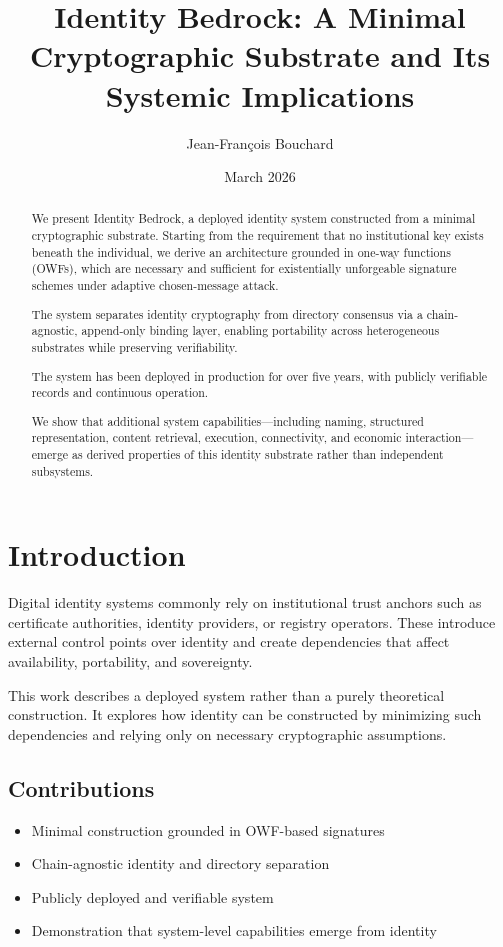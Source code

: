 \documentclass[11pt,a4paper]{article}
\title{\textbf{Identity Bedrock: A Minimal Cryptographic Substrate and Its Systemic Implications}}
\author{Jean-François Bouchard}
\date{March 2026}
\begin{document}
\maketitle

\begin{abstract}
We present Identity Bedrock, a deployed identity system constructed from a minimal cryptographic substrate. Starting from the requirement that no institutional key exists beneath the individual, we derive an architecture grounded in one-way functions (OWFs), which are necessary and sufficient for existentially unforgeable signature schemes under adaptive chosen-message attack.

The system separates identity cryptography from directory consensus via a chain-agnostic, append-only binding layer, enabling portability across heterogeneous substrates while preserving verifiability.

The system has been deployed in production for over five years, with publicly verifiable records and continuous operation.

We show that additional system capabilities—including naming, structured representation, content retrieval, execution, connectivity, and economic interaction—emerge as derived properties of this identity substrate rather than independent subsystems.
\end{abstract}

\section{Introduction}

Digital identity systems commonly rely on institutional trust anchors such as certificate authorities, identity providers, or registry operators. These introduce external control points over identity and create dependencies that affect availability, portability, and sovereignty.

This work describes a deployed system rather than a purely theoretical construction. It explores how identity can be constructed by minimizing such dependencies and relying only on necessary cryptographic assumptions.

\subsection{Contributions}

\begin{itemize}
\item Minimal construction grounded in OWF-based signatures
\item Chain-agnostic identity and directory separation
\item Publicly deployed and verifiable system
\item Demonstration that system-level capabilities emerge from identity
\end{itemize}
\end{document}
